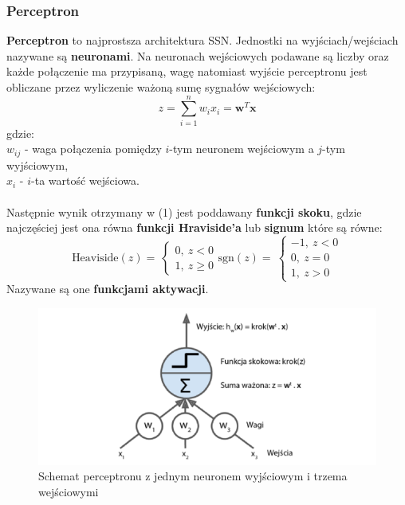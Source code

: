 \documentclass{article}
\renewcommand{\vec}[1]{\mathbf{#1}}
\begin{document}
\subsubsection{Perceptron}
\textbf{Perceptron} to  najprostsza architektura SSN. Jednostki na wyjściach/wejściach
nazywane są \textbf{neuronami}. Na neuronach wejściowych  podawane są liczby oraz
każde połączenie ma przypisaną,  wagę natomiast wyjście perceptronu jest obliczane przez 
wyliczenie ważoną sumę sygnałów wejściowych:
\begin{equation}
	z = \sum_{i=1}^n w_ix_i = \vec{w}^T\vec{x}
\end{equation}
gdzie:\\
$w_{ij}$ - waga połączenia pomiędzy $i$-tym neuronem wejściowym a $j$-tym wyjściowym,\\
$x_i$ - $i$-ta wartość wejściowa.\\ \\
Następnie wynik otrzymany w (1) jest poddawany \textbf{funkcji skoku}, gdzie najczęściej jest 
ona równa \textbf{funkcji Hraviside'a} lub \textbf{signum} które są równe:
\[
	\text{Heaviside}(z) = \
	\begin{cases}
		0, \: z < 0 \\
		1, \: z \geq 0
	\end{cases} 
	\text{sgn}(z) = \
	\begin{cases}
		-1, \: z < 0 \\
		0, \: z = 0 \\
		1, \: z > 0
	\end{cases} 
\]
Nazywane są one \textbf{funkcjami aktywacji}.\\

\begin{figure}[H]
\centering
\includegraphics[scale=0.5]{perceptron.png}
\caption{Schemat perceptronu z jednym neuronem wyjściowym i trzema wejściowymi}
\end{figure}
\end{document}
